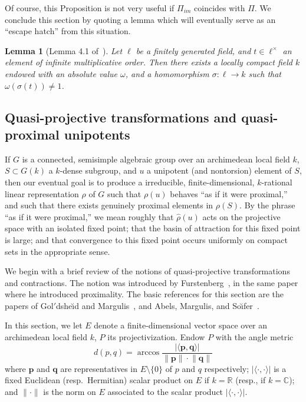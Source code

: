 \documentclass{amsart}
\def\mlprime{\/{\mathsurround=0pt$'$}}
\theoremstyle{plain}
\newtheorem{lemma}[theorem]{Lemma}
\theoremstyle{definition}
\theoremstyle{remark}
\newcommand{\Vect}[1]{\mathbold{#1}}
\providecommand{\abs}[1]{\lvert#1\rvert}
\providecommand{\norm}[1]{\lVert#1\rVert}
\begin{document}
Of course, this Proposition is not very useful if $\Pi_{im}$ coincides with $\Pi$. We
conclude this section by quoting a lemma which will eventually serve as an ``escape
hatch'' from this situation.

\begin{lemma}[Lemma 4.1 of~\cite{MR44:4105}]\label{lem:hatch}
Let $\ell$ be a finitely generated field, and $t \in \ell^{\times}$ an element of
infinite multiplicative
order. Then there exists a locally compact field $k$ endowed with an absolute value $\omega$, and
a homomorphism $\sigma: \ell \to k$ such that $\omega(\sigma(t)) \neq 1$.
\end{lemma}

\subsection[Quasi-projective transformations, quasi-proximality]{Quasi-projective
transformations and quasi-proximal unipotents}\label{sec:quasiProxUnipotent}
If $G$ is a connected, semisimple algebraic group over an archimedean local field $k$, $S
\subset G(k)$ a $k$-dense subgroup, and $u$ a unipotent
(and nontorsion) element of $S$, then our eventual goal is to produce a irreducible, 
finite-dimensional, $k$-rational linear representation $\rho$ of
$G$ such that $\rho(u)$ behaves ``as if it were proximal,'' and such that there exists
genuinely proximal elements in $\rho(S)$. By the phrase ``as if it were proximal,'' we
mean roughly that $\widehat{\rho}(u)$ acts on the projective space with an isolated fixed
point; that the basin of attraction for this fixed point is large; and that
convergence to this fixed point occurs uniformly on compact sets in the appropriate
sense.

We begin with a brief review of the notions of quasi-projective
transformations and contractions. The notion was introduced by
Furstenberg~\cite{MR0352328}, in the same paper where he introduced proximality. The
basic references for this section are the papers of 
Gol\mlprime dshe{\u\i}d and Margulis~\cite{MR1040268}, and Abels, Margulis, and
So{\u\i}fer~\cite{MR1348303}.

In this section, we let $E$ denote a finite-dimensional vector space over an ar\-chi\-medean
local field $k$, $P$ its projectivization. Endow $P$ with the angle metric
$$d(p, q) = \arccos\frac{\abs{\langle \Vect{p}, \Vect{q}\rangle}}{\norm{\Vect{p}}
\cdot\norm{\Vect{q}}}$$
where $\Vect{p}$ and $\Vect{q}$ are representatives in $E\setminus \{0\}$ of
$p$ and $q$ respectively;
 $\abs{\langle \cdot, \cdot\rangle}$ is a fixed Euclidean
(resp.\  Hermitian) scalar product on $E$ if $k = \mathbb{R}$ (resp., if $k =
\mathbb{C}$); and $\norm{\cdot}$ is the norm on $E$ associated to the scalar
product $\abs{\langle \cdot, \cdot\rangle}$.
\end{document}
